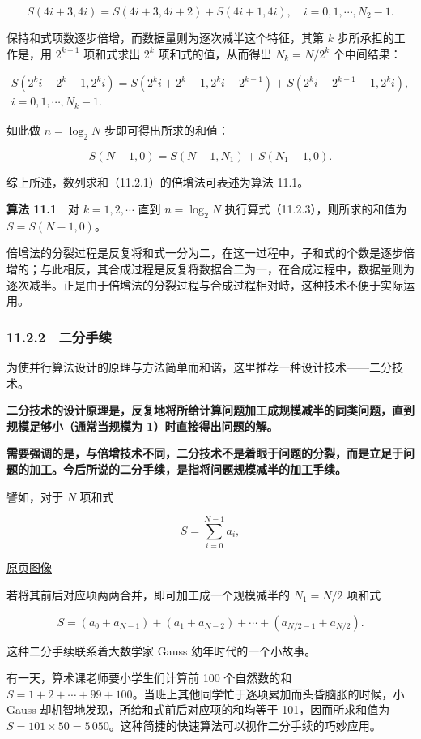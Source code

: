 \documentclass[
  10pt,
  fontset=fandol]{ctexart}
\begin{document}
\[
S(4i+3,4i)=S(4i+3,4i+2)+S(4i+1,4i),\quad i=0,1,\cdots,N_2-1.
\]

保持和式项数逐步倍增，而数据量则为逐次减半这个特征，其第 \(k\) 步所承担的工作是，用 \(2^{k-1}\) 项和式求出 \(2^k\) 项和式的值，从而得出 \(N_k=N/2^k\) 个中间结果：

\[
\begin{gathered}
S(2^ki+2^k-1,2^ki)=S(2^ki+2^k-1,2^ki+2^{k-1})+S(2^ki+2^{k-1}-1,2^ki),\\
i=0,1,\cdots,N_k-1.
\end{gathered}
\tag{11.2.3}
\]

如此做 \(n=\log_2 N\) 步即可得出所求的和值：

\[
S(N-1,0)=S(N-1,N_1)+S(N_1-1,0).
\]

综上所述，数列求和（11.2.1）的倍增法可表述为算法 11.1。

\textbf{算法 11.1}　对 \(k=1,2,\cdots\) 直到 \(n=\log_2 N\) 执行算式（11.2.3），则所求的和值为 \(S=S(N-1,0)\)。

倍增法的分裂过程是反复将和式一分为二，在这一过程中，子和式的个数是逐步倍增的；与此相反，其合成过程是反复将数据合二为一，在合成过程中，数据量则为逐次减半。正是由于倍增法的分裂过程与合成过程相对峙，这种技术不便于实际运用。

\subsubsection{11.2.2　二分手续}\label{ux4e8cux5206ux624bux7eed}

为使并行算法设计的原理与方法简单而和谐，这里推荐一种设计技术------二分技术。

\textbf{二分技术的设计原理是，反复地将所给计算问题加工成规模减半的同类问题，直到规模足够小（通常当规模为 1）时直接得出问题的解。}

\textbf{需要强调的是，与倍增技术不同，二分技术不是着眼于问题的分裂，而是立足于问题的加工。今后所说的二分手续，是指将问题规模减半的加工手续。}

譬如，对于 \(N\) 项和式

\[
S=\sum_{i=0}^{N-1}a_i,
\]

\href{../../source-images/pdf-281.jpeg}{原页图像}

若将其前后对应项两两合并，即可加工成一个规模减半的 \(N_1=N/2\) 项和式

\[
S=(a_0+a_{N-1})+(a_1+a_{N-2})+\cdots+(a_{N/2-1}+a_{N/2}).
\]

这种二分手续联系着大数学家 Gauss 幼年时代的一个小故事。

有一天，算术课老师要小学生们计算前 100 个自然数的和 \(S=1+2+\cdots+99+100\)。当班上其他同学忙于逐项累加而头昏脑胀的时候，小 Gauss 却机智地发现，所给和式前后对应项的和均等于 101，因而所求和值为 \(S=101\times50=5\,050\)。这种简捷的快速算法可以视作二分手续的巧妙应用。
\end{document}
